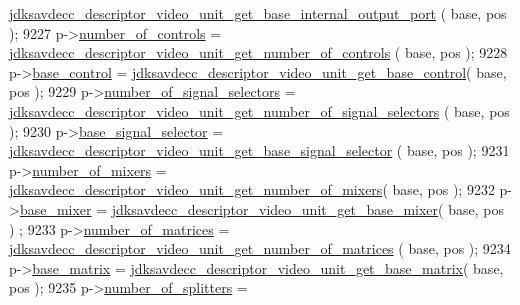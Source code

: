 \begin{DoxyCode}
      \hyperlink{group__descriptor__video_ga79b99365cee06af06fb977d766f18a37}{jdksavdecc\_descriptor\_video\_unit\_get\_base\_internal\_output\_port}
      ( base, pos );
9227         p->\hyperlink{structjdksavdecc__descriptor__video__unit_a0104bea638bdadf1a547c2b93813e22f}{number\_of\_controls} = 
      \hyperlink{group__descriptor__video_ga2b83539def71e89d6893bb6ceb2782b7}{jdksavdecc\_descriptor\_video\_unit\_get\_number\_of\_controls}
      ( base, pos );
9228         p->\hyperlink{structjdksavdecc__descriptor__video__unit_af06eac7dd98377a85258308e8a25e7f2}{base\_control} = 
      \hyperlink{group__descriptor__video_ga85e5741af25e79ba72d650bf6879c71c}{jdksavdecc\_descriptor\_video\_unit\_get\_base\_control}( base, 
      pos );
9229         p->\hyperlink{structjdksavdecc__descriptor__video__unit_af062758f302e01b8b7b7bd84cdb15806}{number\_of\_signal\_selectors} = 
      \hyperlink{group__descriptor__video_ga8ea7f53c6d7e10ced5817ff9b8737229}{jdksavdecc\_descriptor\_video\_unit\_get\_number\_of\_signal\_selectors}
      ( base, pos );
9230         p->\hyperlink{structjdksavdecc__descriptor__video__unit_a5bd998af8a76ae1336006ec16829b64d}{base\_signal\_selector} = 
      \hyperlink{group__descriptor__video_gaa9aff78be73fafa61f37b5b23f880d9c}{jdksavdecc\_descriptor\_video\_unit\_get\_base\_signal\_selector}
      ( base, pos );
9231         p->\hyperlink{structjdksavdecc__descriptor__video__unit_a6d06803f27b9635d1fb276aa4d4a070b}{number\_of\_mixers} = 
      \hyperlink{group__descriptor__video_ga484b68e2f5a5e3dae2462c19b7f7e4e3}{jdksavdecc\_descriptor\_video\_unit\_get\_number\_of\_mixers}(
       base, pos );
9232         p->\hyperlink{structjdksavdecc__descriptor__video__unit_ad2cbeba461f7e25ffee9118ab1343ee0}{base\_mixer} = 
      \hyperlink{group__descriptor__video_ga54cdb2a4eb705488e57df90224925e3b}{jdksavdecc\_descriptor\_video\_unit\_get\_base\_mixer}( base, pos )
      ;
9233         p->\hyperlink{structjdksavdecc__descriptor__video__unit_a0c19f1b0409a0cdaaf557f4a7a717260}{number\_of\_matrices} = 
      \hyperlink{group__descriptor__video_gaf69b40cfb6a4e25a4f7bc63feab589aa}{jdksavdecc\_descriptor\_video\_unit\_get\_number\_of\_matrices}
      ( base, pos );
9234         p->\hyperlink{structjdksavdecc__descriptor__video__unit_a4faf17fd3b3d91f6b24fe8d66a042309}{base\_matrix} = 
      \hyperlink{group__descriptor__video_ga3aefeb88cf3745de9657a7d6bfc7a8b6}{jdksavdecc\_descriptor\_video\_unit\_get\_base\_matrix}( base, pos
       );
9235         p->\hyperlink{structjdksavdecc__descriptor__video__unit_a3b40548ad0ea8b330660dcee0de42db7}{number\_of\_splitters} = 

\end{DoxyCode}
